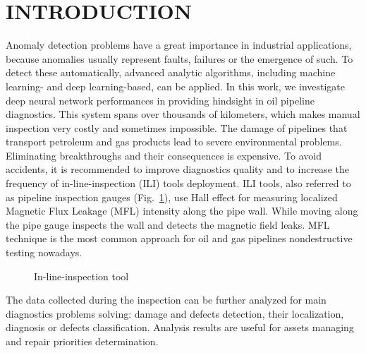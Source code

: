\section{INTRODUCTION}
\label{INTRODUCTION}
Anomaly detection problems have a great importance in industrial applications, because anomalies usually represent faults, failures or the emergence of such.
To detect these automatically, advanced analytic algorithms, including machine learning- and deep learning-based, can be applied.
In this work, we investigate deep neural network performances in providing hindsight in oil pipeline diagnostics.
This system spans over thousands of kilometers, which makes manual inspection very costly and sometimes impossible.
The damage of pipelines that transport petroleum and gas products lead to severe environmental problems.
Eliminating breakthroughs and their consequences is expensive.
To avoid accidents, it is recommended to improve diagnostics quality and to increase the frequency of in-line-inspection (ILI) tools deployment.
ILI tools, also referred to as pipeline inspection gauges (Fig.~\ref{ris:ili}), use Hall effect for measuring localized Magnetic Flux Leakage (MFL) intensity along the pipe wall. While moving along the pipe gauge inspects the wall and detects the magnetic field leaks. MFL technique is the most common approach for oil and gas pipelines nondestructive testing nowadays.
\begin{figure}[ht]
	\caption{In-line-inspection tool}
	\label{ris:ili}
\end{figure}
The data collected during the inspection can be further analyzed for main diagnostics problems solving: damage and defects detection, their localization, diagnosis or defects classification.
Analysis results are useful for assets managing and repair priorities determination.

